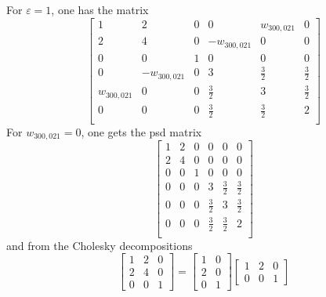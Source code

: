 \documentclass[nonacm]{acmart}
\begin{document}
For $\varepsilon=1$, one has the matrix
\begin{equation*}
    \begin{bmatrix}
        1           & 2            & 0 & 0            & w_{300,021} & 0       \\
        2           & 4            & 0 & -w_{300,021} & 0           & 0       \\
        0           & 0            & 1 & 0            & 0           & 0       \\
        0           & -w_{300,021} & 0 & 3            & \frac32     & \frac32 \\
        w_{300,021} & 0            & 0 & \frac32      & 3           & \frac32 \\
        0           & 0            & 0 & \frac32      & \frac32     & 2       \\
    \end{bmatrix}
\end{equation*}
For $w_{300,021}=0$, one gets the psd matrix
\begin{equation*}
    \begin{bmatrix}
        1 & 2 & 0 & 0       & 0       & 0       \\
        2 & 4 & 0 & 0       & 0       & 0       \\
        0 & 0 & 1 & 0       & 0       & 0       \\
        0 & 0 & 0 & 3       & \frac32 & \frac32 \\
        0 & 0 & 0 & \frac32 & 3       & \frac32 \\
        0 & 0 & 0 & \frac32 & \frac32 & 2       \\
    \end{bmatrix}
\end{equation*}
and from the Cholesky decompositions
\begin{equation*}
    \begin{bmatrix}
        1 & 2 & 0 \\
        2 & 4 & 0 \\
        0 & 0 & 1
    \end{bmatrix}
    =
    \begin{bmatrix}
        1 & 0 \\
        2 & 0 \\
        0 & 1
    \end{bmatrix}
    \begin{bmatrix}
        1 & 2 & 0 \\
        0 & 0 & 1
    \end{bmatrix}
\end{equation*}
\end{document}
